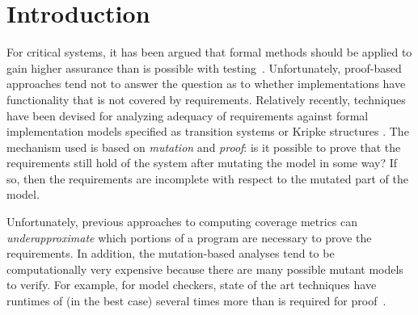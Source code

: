 \section{Introduction}
\label{sec:intro}
%

For critical systems, it has been argued that formal methods should be applied to gain higher assurance than is possible with testing~\cite{Miller10:CACM}. Unfortunately, proof-based approaches tend not to answer the question as to whether implementations have functionality that is not covered by requirements.
Relatively recently, techniques have been devised for analyzing adequacy of requirements against formal implementation models specified as transition systems or Kripke structures \cite{chockler2001practical,das2005formal, claessen2007coverage, grosse2007estimating}.  %
The mechanism used is based on {\em mutation} and {\em proof}: is it possible to prove that the requirements still hold of the system after mutating the model in some way?  If so, then the requirements are incomplete with respect to the mutated part of the model.

Unfortunately, previous approaches to computing coverage metrics can {\em underapproximate} which portions of a program are necessary to prove the requirements. %
In addition, the mutation-based analyses tend to be computationally very expensive because there are many possible mutant models to verify.  For example, for model checkers, state of the art techniques have runtimes of (in the best case) several times more than is required for proof~\cite{chockler2010coverage}.

